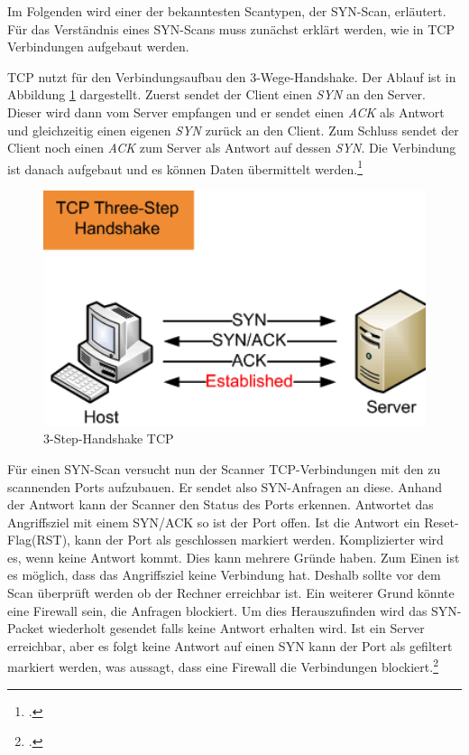 Im Folgenden wird einer der bekanntesten Scantypen, der SYN-Scan, erläutert. Für das Verständnis eines SYN-Scans muss zunächst erklärt werden, wie in TCP Verbindungen aufgebaut werden.

TCP nutzt für den Verbindungsaufbau den 3-Wege-Handshake. Der Ablauf ist in Abbildung \ref{fig:handshake} dargestellt. Zuerst sendet der Client einen \textit{SYN} an den Server. Dieser wird dann vom Server empfangen und er sendet einen \textit{ACK} als Antwort und gleichzeitig einen eigenen \textit{SYN} zurück an den Client. Zum Schluss sendet der Client noch einen \textit{ACK} zum Server als Antwort auf dessen \textit{SYN}. Die Verbindung ist danach aufgebaut und es können Daten übermittelt werden.\footcite[Vgl.][32]{port2}
\begin{figure}[H]
  \centering
  \includegraphics[width=15cm]{images/handshake}
  \caption[3-Step-Handshake TCP]{3-Step-Handshake TCP\protect\footnotemark}
  \label{fig:handshake}
\end{figure}

Für einen SYN-Scan versucht nun der Scanner TCP-Verbindungen mit den zu scannenden Ports aufzubauen. Er sendet also SYN-Anfragen an diese. Anhand der Antwort kann der Scanner den Status des Ports erkennen. Antwortet das Angriffsziel mit einem SYN/ACK so ist der Port offen. Ist die Antwort ein Reset-Flag(RST), kann der Port als geschlossen markiert werden. Komplizierter wird es, wenn keine Antwort kommt. Dies kann mehrere Gründe haben. Zum Einen ist es möglich, dass das Angriffsziel keine Verbindung hat. Deshalb sollte vor dem Scan überprüft werden ob der Rechner erreichbar ist. Ein weiterer Grund könnte eine Firewall sein, die Anfragen blockiert. Um dies Herauszufinden wird das SYN-Packet wiederholt gesendet falls keine Antwort erhalten wird. Ist ein Server erreichbar, aber es folgt keine Antwort auf einen SYN kann der Port als gefiltert markiert werden, was aussagt, dass eine Firewall die Verbindungen blockiert.\footcite[Vgl.][33]{port2}

